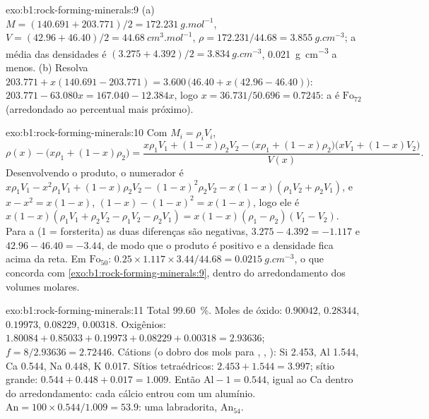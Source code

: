 \begin{solution}{exo:b1:rock-forming-minerals:9}
(a) $M = (140.691 + 203.771)/2 = \qty{172.231}{g.mol^{-1}}$, $V = (42.96 +
46.40)/2 = \qty{44.68}{cm^3.mol^{-1}}$, $\rho = 172.231/44.68 =
\qty{3.855}{g.cm^{-3}}$; a média das densidades é $(3.275 + 4.392)/2 =
\qty{3.834}{g.cm^{-3}}$, \qty{0.021}{g.cm^{-3}} a menos. (b) Resolva
$203.771 + x(140.691 - 203.771) = 3.600\,\bigl(46.40 + x(42.96 - 46.40)\bigr)$:
$203.771 - 63.080x = 167.040 - 12.384x$, logo $x = 36.731/50.696 = 0.7245$: a
 é $\text{Fo}_{72}$ (arredondado ao percentual mais próximo).
\end{solution}

\begin{solution}{exo:b1:rock-forming-minerals:10}
Com $M_i = \rho_i V_i$,
\[
  \rho(x) - \bigl(x\rho_1 + (1 - x)\rho_2\bigr)
  = \frac{x\rho_1V_1 + (1 - x)\rho_2V_2 - \bigl(x\rho_1 + (1 - x)\rho_2\bigr)\bigl(xV_1 + (1 - x)V_2\bigr)}{V(x)} .
\]
Desenvolvendo o produto, o numerador é $x\rho_1V_1 - x^2\rho_1V_1 +
(1 - x)\rho_2V_2 - (1 - x)^2\rho_2V_2 - x(1 - x)(\rho_1V_2 + \rho_2V_1)$, e
$x - x^2 = x(1 - x)$, $(1 - x) - (1 - x)^2 = x(1 - x)$, logo ele é
$x(1 - x)(\rho_1V_1 + \rho_2V_2 - \rho_1V_2 - \rho_2V_1) =
x(1 - x)(\rho_1 - \rho_2)(V_1 - V_2)$. Para a  (1 = forsterita) as duas
diferenças são negativas, $3.275 - 4.392 = -1.117$ e $42.96 - 46.40 =
-3.44$, de modo que o produto é positivo e a densidade fica acima da reta. Em $\text{Fo}_{50}$: $0.25\times1.117\times3.44/44.68 =
\qty{0.0215}{g.cm^{-3}}$, o que concorda com \cref{exo:b1:rock-forming-minerals:9}, dentro do arredondamento dos volumes molares.
\end{solution}

\begin{solution}{exo:b1:rock-forming-minerals:11}
Total \qty{99.60}{\percent}. Moles de óxido:  $0.90042$,
 $0.28344$,  $0.19973$,  $0.08229$,
 $0.00318$. Oxigênios: $1.80084 + 0.85033 + 0.19973 + 0.08229 +
0.00318 = 2.93636$; $f = 8/2.93636 = 2.72446$. Cátions (o dobro dos mols para
, , ): Si \num{2.453}, Al \num{1.544}, Ca
\num{0.544}, Na \num{0.448}, K \num{0.017}. Sítios tetraédricos:
$2.453 + 1.544 = 3.997$; sítio grande: $0.544 + 0.448 + 0.017 = 1.009$. Então
$\mathrm{Al} - 1 = 0.544$, igual ao Ca dentro do arredondamento: cada cálcio entrou com um alumínio. $\mathrm{An} = 100\times0.544/1.009 = 53.9$: uma labradorita, $\text{An}_{54}$.
\end{solution}

